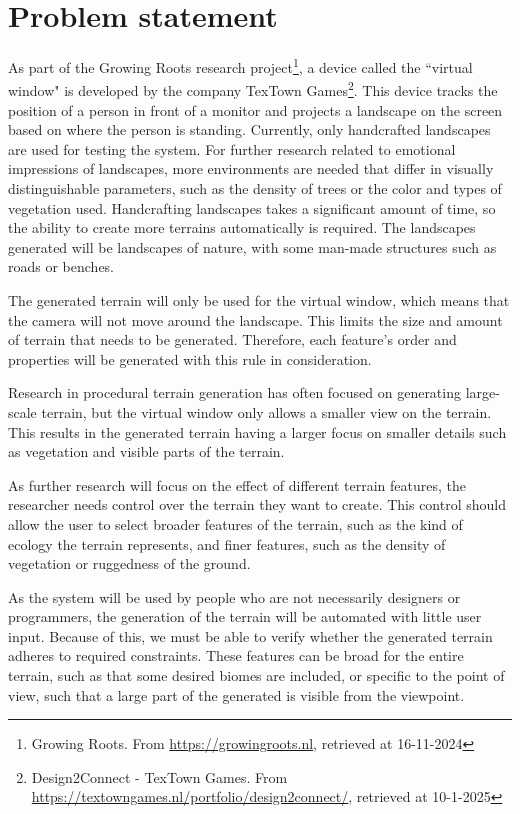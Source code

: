 \section{Problem statement}
As part of the Growing Roots research project\footnote{Growing Roots. From \url{https://growingroots.nl}, retrieved at 16-11-2024}, a device called the ``virtual window" is developed by the company TexTown Games\footnote{Design2Connect - TexTown Games. From \url{https://textowngames.nl/portfolio/design2connect/}, retrieved at 10-1-2025}. This device tracks the position of a person in front of a monitor and projects a landscape on the screen based on where the person is standing. Currently, only handcrafted landscapes are used for testing the system. For further research related to emotional impressions of landscapes, more environments are needed that differ in visually distinguishable parameters, such as the density of trees or the color and types of vegetation used. Handcrafting landscapes takes a significant amount of time, so the ability to create more terrains automatically is required. The landscapes generated will be landscapes of nature, with some man-made structures such as roads or benches. 

The generated terrain will only be used for the virtual window, which means that the camera will not move around the landscape. This limits the size and amount of terrain that needs to be generated. Therefore, each feature's order and properties will be generated with this rule in consideration.

Research in procedural terrain generation has often focused on generating large-scale terrain, but the virtual window only allows a smaller view on the terrain. This results in the generated terrain having a larger focus on smaller details such as vegetation and visible parts of the terrain.

As further research will focus on the effect of different terrain features, the researcher needs control over the terrain they want to create. This control should allow the user to select broader features of the terrain, such as the kind of ecology the terrain represents, and finer features, such as the density of vegetation or ruggedness of the ground.

As the system will be used by people who are not necessarily designers or programmers, the generation of the terrain will be automated with little user input. Because of this, we must be able to verify whether the generated terrain adheres to required constraints. These features can be broad for the entire terrain, such as that some desired biomes are included, or specific to the point of view, such that a large part of the generated is visible from the viewpoint.